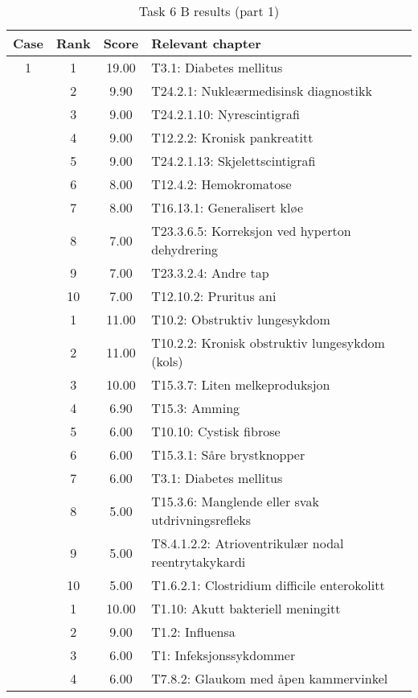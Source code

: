 \begin{table}[htbp] \footnotesize \center
\caption{Task 6 B results (part 1)\label{tab:task6b1}}
\begin{tabular}{c c c l}
    \toprule
    Case & Rank & Score & Relevant chapter \\
    \midrule
    1 & 1 & 19.00 & T3.1: Diabetes mellitus \\
     & 2 & 9.90 & T24.2.1: Nukleærmedisinsk diagnostikk \\
     & 3 & 9.00 & T24.2.1.10: Nyrescintigrafi \\
     & 4 & 9.00 & T12.2.2: Kronisk pankreatitt \\
     & 5 & 9.00 & T24.2.1.13: Skjelettscintigrafi \\
     & 6 & 8.00 & T12.4.2: Hemokromatose \\
     & 7 & 8.00 & T16.13.1: Generalisert kløe \\
     & 8 & 7.00 & T23.3.6.5: Korreksjon ved hyperton dehydrering \\
     & 9 & 7.00 & T23.3.2.4: Andre tap \\
     & 10 & 7.00 & T12.10.2: Pruritus ani \\
	\addlinespace
    2 & 1 & 11.00 & T10.2: Obstruktiv lungesykdom \\
     & 2 & 11.00 & T10.2.2: Kronisk obstruktiv lungesykdom (kols) \\
     & 3 & 10.00 & T15.3.7: Liten melkeproduksjon \\
     & 4 & 6.90 & T15.3: Amming \\
     & 5 & 6.00 & T10.10: Cystisk fibrose \\
     & 6 & 6.00 & T15.3.1: Såre brystknopper \\
     & 7 & 6.00 & T3.1: Diabetes mellitus \\
     & 8 & 5.00 & T15.3.6: Manglende eller svak utdrivningsrefleks \\
     & 9 & 5.00 & T8.4.1.2.2: Atrioventrikulær nodal reentrytakykardi \\%
     & 10 & 5.00 & T1.6.2.1: Clostridium difficile enterokolitt \\
	\addlinespace
    3 & 1 & 10.00 & T1.10: Akutt bakteriell meningitt \\
     & 2 & 9.00 & T1.2: Influensa \\
     & 3 & 6.00 & T1: Infeksjonssykdommer \\
     & 4 & 6.00 & T7.8.2: Glaukom med åpen kammervinkel \\

\end{tabular}
\end{table}
